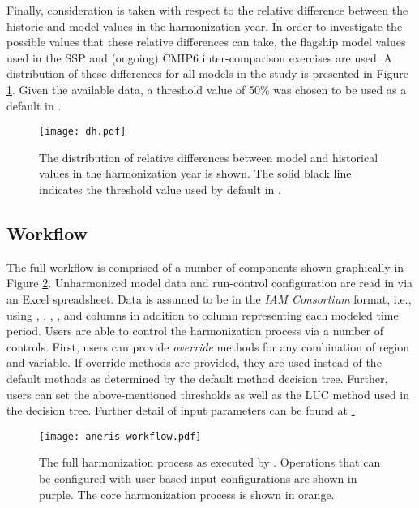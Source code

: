 Finally, consideration is taken with respect to the relative difference between
the historic and model values in the harmonization year. In order to investigate
the possible values that these relative differences can take, the flagship model
values used in the SSP  and (ongoing) CMIP6 inter-comparison exercises
are used. A distribution of these differences for all models in the study is
presented in Figure \ref{fig:dh}. Given the available data, a threshold value of
50\% was chosen to be used as a default in .

\begin{figure}
  \begin{center}
    \texttt{[image: dh.pdf]}
    \caption[]{
      \label{fig:dh}
      The distribution of relative differences between model and historical
      values in the harmonization year is shown. The solid black line indicates
      the threshold value used by default in .  
    }
  \end{center}
\end{figure}

\subsection{ Workflow}

The full  workflow is comprised of a number of components shown
graphically in Figure \ref{fig:workflow}. Unharmonized model data and
run-control configuration are read in via an Excel spreadsheet. Data is assumed
to be in the \textit{IAM Consortium} format, i.e., using ,
, , , and  columns in
addition to column representing each modeled time period. Users are able to
control the harmonization process via a number of controls. First, users can
provide \textit{override} methods for any combination of region and variable. If
override methods are provided, they are used instead of the default methods as
determined by the default method decision tree. Further, users can set the
above-mentioned thresholds as well as the LUC method used in the decision
tree. Further detail of input parameters can be found at
\hyperlink{http://aneris.readthedocs.io/en/latest/}.

\begin{figure}
  \begin{center}
    \texttt{[image: aneris-workflow.pdf]}
    \caption[]{
      \label{fig:workflow}
      The full harmonization process as executed by . Operations
      that can be configured with user-based input configurations are shown in
      purple. The core harmonization process is shown in orange.  }
  \end{center}
\end{figure}

